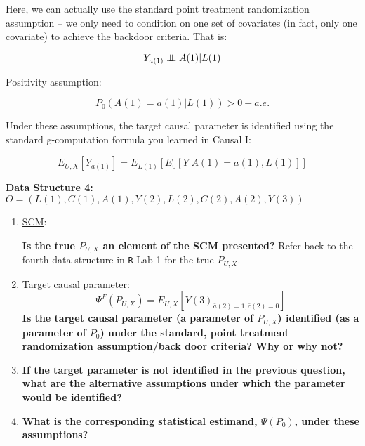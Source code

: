 \documentclass{exam}
\newenvironment{packed_item}{
\begin{itemize}
 \setlength{\itemsep}{0pt}
  \setlength{\parskip}{0pt}
  \setlength{\parsep}{0pt}
}{\end{itemize}}
\newcommand\independent{\protect\mathpalette{\protect\independenT}{\perp}}
\def\independenT#1#2{\mathrel{\setbox0\hbox{$#1#2$}%
    \copy0\kern-\wd0\mkern4mu\box0}}
\begin{document}
\begin{solution}
Here, we can actually use the standard point treatment randomization assumption -- we only need to condition on one set of covariates (in fact, only one covariate) to achieve the backdoor criteria. That is:

\[
Y_{a(1)} \independent A(1) | L(1)
\]

Positivity assumption:

\[
P_0(A(1) = a(1) | L(1)) > 0 - a.e.
\]

Under these assumptions, the target causal parameter is identified using the standard g-computation formula you learned in Causal I:

\[
E_{U,X}[Y_{a(1)}]=E_{L(1)}[E_0[Y|A(1)=a(1),L(1)]]
\]

\end{solution}

\noindent\large\textbf{Data Structure 4: $O = (L(1), C(1), A(1), Y(2), L(2), C(2), A(2), Y(3))$}
\normalsize


\begin{enumerate}
\item \underline{SCM}:
\textbf{Is the true $P_{U,X}$ an element of the SCM presented?} Refer back to the fourth data structure in \texttt{R} Lab 1 for the true $P_{U,X}$.
\item \underline{Target causal parameter}:
\[
\Psi^F(P_{U,X}) = E_{U,X}[Y(3)_{\bar{a}(2)=1, \bar{c}(2)=0}]
\]
\textbf{Is the target causal parameter (a parameter of $P_{U,X}$) identified (as a parameter of $P_0$) under the standard, point treatment randomization assumption/back door criteria? Why or why not?}
\item \textbf{If the target parameter is not identified in the previous question, what are the alternative assumptions under which the parameter would be identified?}
\item \textbf{What is the corresponding statistical estimand, $\Psi(P_0)$, under these assumptions?}
\end{enumerate}
\end{document}

